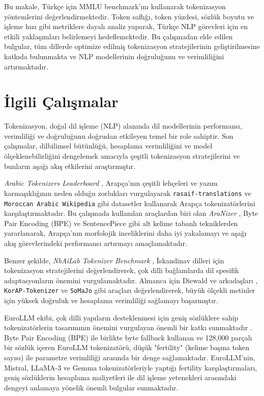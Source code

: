 \documentclass{article}
\begin{document}
Bu makale, Türkçe için MMLU benchmark'ını kullanarak tokenizasyon yöntemlerini değerlendirmektedir. Token saflığı, token yüzdesi, sözlük boyutu ve işleme hızı gibi metriklere dayalı analiz yaparak, Türkçe NLP görevleri için en etkili yaklaşımları belirlemeyi hedeflemektedir. Bu çalışmadan elde edilen bulgular, tüm dillerde optimize edilmiş tokenizasyon stratejilerinin geliştirilmesine katkıda bulunmakta ve NLP modellerinin doğruluğunu ve verimliliğini artırmaktadır.

\section{İlgili Çalışmalar}

Tokenizasyon, doğal dil işleme (NLP) alanında dil modellerinin performansı, verimliliği ve doğruluğunu doğrudan etkileyen temel bir role sahiptir. Son çalışmalar, dilbilimsel bütünlüğü, hesaplama verimliliğini ve model ölçeklenebilirliğini dengelemek amacıyla çeşitli tokenizasyon stratejilerini ve bunların aşağı akış etkilerini araştırmıştır.

\textit{Arabic Tokenizers Leaderboard} \cite{rashad_arabic_nodate}, Arapça'nın çeşitli lehçeleri ve yazım karmaşıklığının neden olduğu zorlukları vurgulayarak \texttt{rasaif-translations} ve \texttt{Moroccan Arabic Wikipedia} gibi datasetler kullanarak Arapça tokenizatörlerini karşılaştırmaktadır. Bu çalışmada kullanılan araçlardan biri olan \textit{AraNizer} \cite{koubaa_githubcomriotu-labaranizer_2024}, Byte Pair Encoding (BPE) ve SentencePiece gibi alt kelime tabanlı tekniklerden yararlanarak, Arapça’nın morfolojik inceliklerini daha iyi yakalamayı ve aşağı akış görevlerindeki performansı artırmayı amaçlamaktadır.

Benzer şekilde, \textit{NbAiLab Tokenizer Benchmark} \cite{rosa_nbailabtokenizer-benchmark_2024}, İskandinav dilleri için tokenizasyon stratejilerini değerlendirerek, çok dilli bağlamlarda dil spesifik adaptasyonların önemini vurgulamaktadır. Almanca için Diewald ve arkadaşları \cite{diewald_tokenizing_2022}, \texttt{KorAP-Tokenizer} ve \texttt{SoMaJo} gibi araçları değerlendirerek, büyük ölçekli metinler için yüksek doğruluk ve hesaplama verimliliği sağlamayı başarmıştır.

EuroLLM ekibi, çok dilli yapıların desteklenmesi için geniş sözlüklere sahip tokenizatörlerin tasarımının önemini vurgulayan önemli bir katkı sunmaktadır \cite{martins_eurollm_2024}. Byte Pair Encoding (BPE) ile birlikte byte fallback kullanan ve 128,000 parçalı bir sözlük içeren EuroLLM tokenizatörü, düşük "fertility" (kelime başına token sayısı) ile parametre verimliliği arasında bir denge sağlamaktadır. EuroLLM’nin, Mistral, LLaMA-3 ve Gemma tokenizatörleriyle yaptığı fertility karşılaştırmaları, geniş sözlüklerin hesaplama maliyetleri ile dil işleme yetenekleri arasındaki dengeyi anlamaya yönelik önemli bulgular sunmaktadır.
\end{document}

